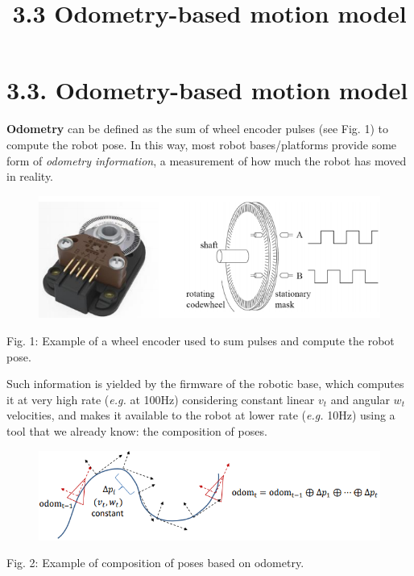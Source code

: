 \documentclass[11pt]{article}
\title{3.3 Odometry-based motion model}
\begin{document}
    
    \maketitle
    
    

    
    \hypertarget{odometry-based-motion-model}{%
\section{3.3. Odometry-based motion
model}\label{odometry-based-motion-model}}

\textbf{Odometry} can be defined as the sum of wheel encoder pulses (see
Fig. 1) to compute the robot pose. In this way, most robot
bases/platforms provide some form of \emph{odometry information}, a
measurement of how much the robot has moved in reality.


\begin{figure}
\centering
\includegraphics{images/fig3-3-encoder.PNG}
\end{figure}
Fig. 1: Example of a wheel encoder used to sum pulses and compute the
robot pose.

Such information is yielded by the firmware of the robotic base, which
computes it at very high rate (\emph{e.g.} at 100Hz) considering
constant linear \(v_t\) and angular \(w_t\) velocities, and makes it
available to the robot at lower rate (\emph{e.g.} 10Hz) using a tool
that we already know: the composition of poses.

\begin{figure}
\centering
\includegraphics{images/fig3-3-odometry_compositions.PNG}
\end{figure}
Fig. 2: Example of composition of poses based on odometry.
\end{document}
